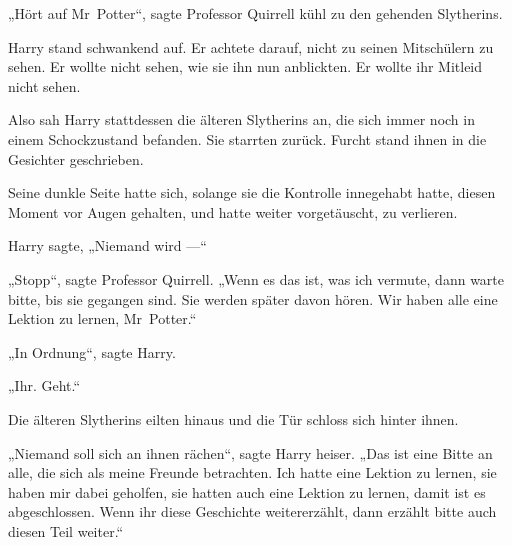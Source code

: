 „Hört auf Mr~Potter“, sagte Professor Quirrell kühl zu den gehenden Slytherins.

Harry stand schwankend auf. Er achtete darauf, nicht zu seinen Mitschülern zu sehen. Er wollte nicht sehen, wie sie ihn nun anblickten. Er wollte ihr Mitleid nicht sehen.

Also sah Harry stattdessen die älteren Slytherins an, die sich immer noch in einem Schockzustand befanden. Sie starrten zurück. Furcht stand ihnen in die Gesichter geschrieben.

Seine dunkle Seite hatte sich, solange sie die Kontrolle innegehabt hatte, diesen Moment vor Augen gehalten, und hatte weiter vorgetäuscht, zu verlieren.

Harry sagte,
„Niemand wird —“

„Stopp“, sagte Professor Quirrell.
„Wenn es das ist, was ich vermute, dann warte bitte, bis sie gegangen sind. Sie werden später davon hören. Wir haben alle eine Lektion zu lernen, Mr~Potter.“

„In Ordnung“, sagte Harry.

„Ihr. Geht.“

Die älteren Slytherins eilten hinaus und die Tür schloss sich hinter ihnen.

„Niemand soll sich an ihnen rächen“, sagte Harry heiser.
„Das ist eine Bitte an alle, die sich als meine Freunde betrachten. Ich hatte eine Lektion zu lernen, sie haben mir dabei geholfen, sie hatten auch eine Lektion zu lernen, damit ist es abgeschlossen. Wenn ihr diese Geschichte weitererzählt, dann erzählt bitte auch diesen Teil weiter.“


